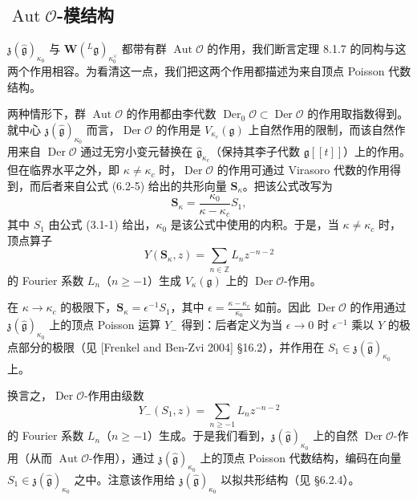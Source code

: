 \subsection{$\operatorname{Aut}\mathcal O$-模结构}

$\mathfrak z(\hat{\mathfrak g})_{\kappa_0}$ 与 $\mathbf W({}^L\mathfrak g)_{\kappa^\vee_0}$ 都带有群 $\operatorname{Aut}\mathcal O$ 的作用，我们断言定理 8.1.7 的同构与这两个作用相容。为看清这一点，我们把这两个作用都描述为来自顶点 Poisson 代数结构。

两种情形下，群 $\operatorname{Aut}\mathcal O$ 的作用都由李代数 $\operatorname{Der}_0\mathcal O\subset\operatorname{Der}\mathcal O$ 的作用取指数得到。就中心 $\mathfrak z(\hat{\mathfrak g})_{\kappa_0}$ 而言，$\operatorname{Der}\mathcal O$ 的作用是 $V_{\kappa_c}(\mathfrak g)$ 上自然作用的限制，而该自然作用来自 $\operatorname{Der}\mathcal O$ 通过无穷小变元替换在 $\hat{\mathfrak g}_{\kappa_c}$（保持其李子代数 $\mathfrak g[\![t]\!]$）上的作用。但在临界水平之外，即 $\kappa\ne\kappa_c$ 时，$\operatorname{Der}\mathcal O$ 的作用可通过 Virasoro 代数的作用得到，而后者来自公式 (6.2-5) 给出的共形向量 $\mathbf S_\kappa$。把该公式改写为
\[
    \mathbf S_\kappa=\frac{\kappa_0}{\kappa-\kappa_c}S_1,
\]
其中 $S_1$ 由公式 (3.1-1) 给出，$\kappa_0$ 是该公式中使用的内积。于是，当 $\kappa\ne\kappa_c$ 时，顶点算子
\[
    Y(\mathbf S_\kappa,z)=\sum_{n\in\mathbb Z}L_nz^{-n-2}
\]
的 Fourier 系数 $L_n$（$n\ge-1$）生成 $V_\kappa(\mathfrak g)$ 上的 $\operatorname{Der}\mathcal O$-作用。

在 $\kappa\to\kappa_c$ 的极限下，$\mathbf S_\kappa=\epsilon^{-1}S_1$，其中 $\epsilon=\frac{\kappa-\kappa_c}{\kappa_0}$ 如前。因此 $\operatorname{Der}\mathcal O$ 的作用通过 $\mathfrak z(\hat{\mathfrak g})_{\kappa_0}$ 上的顶点 Poisson 运算 $Y_-$ 得到：后者定义为当 $\epsilon\to0$ 时 $\epsilon^{-1}$ 乘以 $Y$ 的极点部分的极限（见 [Frenkel and Ben-Zvi 2004] §16.2），并作用在 $S_1\in\mathfrak z(\hat{\mathfrak g})_{\kappa_0}$ 上。

换言之，$\operatorname{Der}\mathcal O$-作用由级数
\[
    Y_-(S_1,z)=\sum_{n\ge-1}L_nz^{-n-2}
\]
的 Fourier 系数 $L_n$（$n\ge-1$）生成。于是我们看到，$\mathfrak z(\hat{\mathfrak g})_{\kappa_0}$ 上的自然 $\operatorname{Der}\mathcal O$-作用（从而 $\operatorname{Aut}\mathcal O$-作用），通过 $\mathfrak z(\hat{\mathfrak g})_{\kappa_0}$ 上的顶点 Poisson 代数结构，编码在向量 $S_1\in\mathfrak z(\hat{\mathfrak g})_{\kappa_0}$ 之中。注意该作用给 $\mathfrak z(\hat{\mathfrak g})_{\kappa_0}$ 以拟共形结构（见 §6.2.4）。

